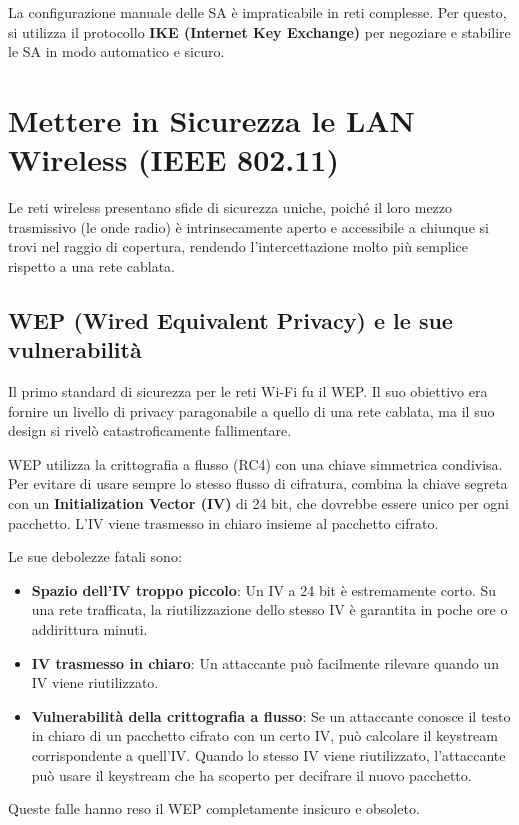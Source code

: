 La configurazione manuale delle SA è impraticabile in reti complesse. Per questo, si utilizza il protocollo \textbf{IKE (Internet Key Exchange)} per negoziare e stabilire le SA in modo automatico e sicuro.
\section{Mettere in Sicurezza le LAN Wireless (IEEE 802.11)}
Le reti wireless presentano sfide di sicurezza uniche, poiché il loro mezzo trasmissivo (le onde radio) è intrinsecamente aperto e accessibile a chiunque si trovi nel raggio di copertura, rendendo l'intercettazione molto più semplice rispetto a una rete cablata.

\subsection{WEP (Wired Equivalent Privacy) e le sue vulnerabilità}
Il primo standard di sicurezza per le reti Wi-Fi fu il WEP. Il suo obiettivo era fornire un livello di privacy paragonabile a quello di una rete cablata, ma il suo design si rivelò catastroficamente fallimentare.

WEP utilizza la crittografia a flusso (RC4) con una chiave simmetrica condivisa. Per evitare di usare sempre lo stesso flusso di cifratura, combina la chiave segreta con un \textbf{Initialization Vector (IV)} di 24 bit, che dovrebbe essere unico per ogni pacchetto. L'IV viene trasmesso in chiaro insieme al pacchetto cifrato.

Le sue debolezze fatali sono:
\begin{itemize}
    \item \textbf{Spazio dell'IV troppo piccolo}: Un IV a 24 bit è estremamente corto. Su una rete trafficata, la riutilizzazione dello stesso IV è garantita in poche ore o addirittura minuti.
    \item \textbf{IV trasmesso in chiaro}: Un attaccante può facilmente rilevare quando un IV viene riutilizzato.
    \item \textbf{Vulnerabilità della crittografia a flusso}: Se un attaccante conosce il testo in chiaro di un pacchetto cifrato con un certo IV, può calcolare il keystream corrispondente a quell'IV. Quando lo stesso IV viene riutilizzato, l'attaccante può usare il keystream che ha scoperto per decifrare il nuovo pacchetto.
\end{itemize}

Queste falle hanno reso il WEP completamente insicuro e obsoleto.

